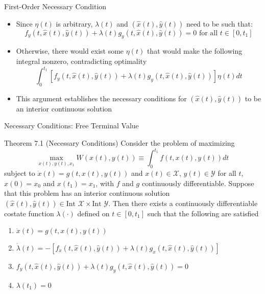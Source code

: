 \documentclass[9pt,aspectratio=169]{beamer}
\newcommand{\X}{\mathcal{X}}
\newcommand{\Y}{\mathcal{Y}}
\begin{document}
\begin{frame}{First-Order Necessary Condition}
    \begin{itemize}
        \item Since $\eta(t)$ is arbitrary, $\lambda(t)$ and $(\hat{x}(t),
        \hat{y}(t))$ need to be such that:
        \begin{equation*}
            f_y(t, \hat{x}(t), \hat{y}(t)) + \lambda(t)g_y(t, \hat{x}(t),
            \hat{y}(t)) = 0 \text{ for all } t \in [0, t_1]
        \end{equation*}
        \item Otherwise, there would exist some $\eta(t)$ that would make the
        following integral nonzero, contradicting optimality
        \begin{equation*}
            \int_0^{t_1} [f_y(t, \hat{x}(t), \hat{y}(t)) + \lambda(t)g_y(t,
            \hat{x}(t), \hat{y}(t))]\eta(t)dt
        \end{equation*}
        \item This argument establishes the necessary conditions for
        $(\hat{x}(t), \hat{y}(t))$ to be an interior continuous solution
    \end{itemize}
\end{frame}

\begin{frame}{Necessary Conditions: Free Terminal Value}
    \begin{block}{Theorem 7.1 (Necessary Conditions)}
        Consider the problem of maximizing
        \begin{equation*}
            \max_{x(t),y(t),x_1} W(x(t), y(t)) \equiv \int_0^{t_1} f(t, x(t), y(t))dt
        \end{equation*}
        subject to $\dot{x}(t) = g(t, x(t), y(t))$ and $x(t) \in \X$, $y(t)
        \in \Y$ for all $t$, $x(0) = x_0$ and $x(t_1) = x_1$, with $f$ and
        $g$ continuously differentiable. Suppose that this problem has an
        interior continuous solution $(\hat{x}(t), \hat{y}(t)) \in \text{Int
        } \X \times \text{Int } \Y$. Then there exists a continuously differentiable
        costate function $\lambda(\cdot)$ defined on $t \in [0, t_1]$ such
        that the following are satisfied
        \begin{enumerate}
            \item $\dot{x}(t) = g(t, x(t), y(t))$
            \item $\dot{\lambda}(t) = -[f_x(t, \hat{x}(t), \hat{y}(t)) +
            \lambda(t)g_x(t, \hat{x}(t), \hat{y}(t))]$
            \item $f_y(t, \hat{x}(t), \hat{y}(t)) + \lambda(t)g_y(t,
            \hat{x}(t), \hat{y}(t)) = 0$
            \item $\lambda(t_1) = 0$
        \end{enumerate}
    \end{block}
\end{frame}
\end{document}
